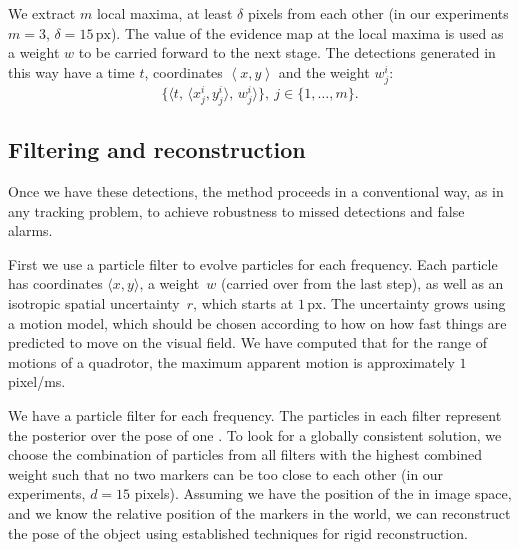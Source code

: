 We extract $m$ local maxima, at least $\delta$ pixels from each
other (in our experiments $m=3$, $\delta=15\,\mbox{px}$). The value
of the evidence map at the local maxima is used as a weight $w$ to
be carried forward to the next stage. The detections generated in
this way have a time $t$, coordinates $\left\langle x,y\right\rangle $
and the weight $w_{j}^{i}$: 
\[
\{\langle t,\,\langle x_{j}^{i},y_{j}^{i}\rangle,\, w_{j}^{i}\rangle\},\ j\in\{1,\dots,m\}.
\]



\subsection{Filtering and reconstruction}

Once we have these detections, the method proceeds in a conventional
way, as in any tracking problem, to achieve robustness to missed detections
and false alarms. 

First we use a particle filter to evolve particles for each frequency.
Each particle has coordinates $\langle x,y\rangle$, a weight~$w$
(carried over from the last step), as well as an isotropic spatial
uncertainty~$r$, which starts at $1\,\mbox{px}$. The uncertainty
grows using a motion model, which should be chosen according to how
on how fast things are predicted to move on the visual field. We have
computed that for the range of motions of a quadrotor, the maximum
apparent motion is approximately $1$ pixel/ms.

We have a particle filter for each frequency. The particles in each
filter represent the posterior over the pose of one \ALM. To look
for a globally consistent solution, we choose the combination of particles
from all filters with the highest combined weight such that no two
markers can be too close to each other (in our experiments, $d=15$
pixels). Assuming we have the position of the \ALMs in image space,
and we know the relative position of the markers in the world, we
can reconstruct the pose of the object using established techniques
for rigid reconstruction.
